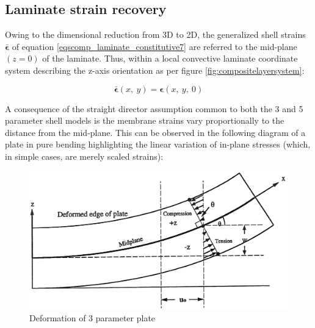 \subsection{Laminate strain recovery}

Owing to the dimensional reduction from 3D to 2D, the generalized shell strains $\bar{\boldsymbol{\epsilon}}$ of equation \ref{eqscomp_laminate_constitutive7} are referred to the mid-plane $(z=0)$ of the laminate. Thus, within a local convective laminate coordinate system describing the z-axis orientation as per figure \ref{fig:compositelayersystem}:

\begin{equation} 
\bar{\boldsymbol{\epsilon}} (x,\ y) = \boldsymbol{\epsilon} (x,\ y,\ 0)
\label{eqscomp_strain_recovery1}
\end{equation}

A consequence of the straight director assumption common to both the 3 and 5 parameter shell models is the membrane strains vary proportionally to the distance from the mid-plane. This can be observed in the following diagram of a plate in pure bending highlighting the linear variation of in-plane stresses (which, in simple cases, are merely scaled strains):

\begin{figure}[H]
	\centering
	\def\svgwidth{\columnwidth}
	\includegraphics[width=12cm]{images/composite_nasa_strains.png}
	\caption{Deformation of 3 parameter plate \cite{nasanettles1994}}
	\label{fig:compositenasastrains}
\end{figure}

